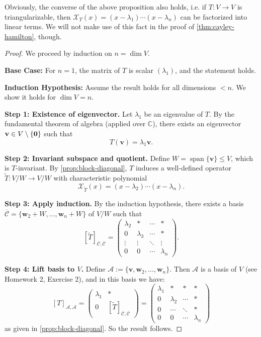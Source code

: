 Obviously, the converse of the above proposition also holds, i.e. if $T:V \to V$ is triangularizable, then $\mathcal{X}_T(x) = (x - \lambda_1) \cdots (x - \lambda_n)$ can be factorized into linear terms. We will not make use of this fact in the proof of \autoref{thm:cayley-hamilton}, though.
\begin{proof}
We proceed by induction on \( n = \dim V \).

\textbf{Base Case:} For \( n = 1 \), the matrix of \( T \) is scalar \( (\lambda_1) \), and the statement holds.

\textbf{Induction Hypothesis:} Assume the result holds for all dimensions \( < n \). We show it holds for \( \dim V = n \).

\textbf{Step 1: Existence of eigenvector.}
Let \( \lambda_1 \) be an eigenvalue of \( T \). By the fundamental theorem of algebra (applied over \( \mathbb{C} \)), there exists an eigenvector \( \mathbf{v} \in V \setminus \{{\bf 0}\} \) such that
\[
T(\mathbf{v}) = \lambda_1 \mathbf{v}.
\]

\textbf{Step 2: Invariant subspace and quotient.}
Define \( W = \operatorname{span}\{\mathbf{v}\} \leq V \), which is \( T \)-invariant. By \autoref{prop:block-diagonal}, \( T \) induces a well-defined operator \( \widetilde{T} : V/W \to V/W \) with characteristic polynomial
\[
\mathcal{X}_{\widetilde{T}}(x) = (x - \lambda_2) \cdots (x - \lambda_n).
\]

\textbf{Step 3: Apply induction.}
By the induction hypothesis, there exists a basis \( \overline{\mathcal{C}} = \{ \mathbf{w}_2 + W, \dots, \mathbf{w}_n + W \} \) of \( V/W \) such that
\[
[\widetilde{T}]_{\overline{\mathcal{C}}, \overline{\mathcal{C}}} =
\begin{pmatrix}
\lambda_2 & * & \cdots & * \\
0 & \lambda_3 & \cdots & * \\
\vdots & \vdots & \ddots & \vdots \\
0 & 0 & \cdots & \lambda_n
\end{pmatrix}.
\]

\textbf{Step 4: Lift basis to \( V \).}
Define \( \mathcal{A} := \{ \mathbf{v}, \mathbf{w}_2, \dots, \mathbf{w}_n \} \). Then \( \mathcal{A} \) is a basis of \( V \) (see Homework 2, Exercise 2), and in this basis we have:
\[
[T]_{\mathcal{A}, \mathcal{A}} =
\begin{pmatrix}
\lambda_1 & * \\
0 & [\widetilde{T}]_{\overline{\mathcal{C}}, \overline{\mathcal{C}}}
\end{pmatrix}
=
\begin{pmatrix}
\lambda_1 & * & * & * \\
0 & \lambda_2 & \cdots & * \\
0 & \cdots & \ddots & * \\
0 & 0 & \cdots & \lambda_n
\end{pmatrix}
\]
as given in \autoref{prop:block-diagonal}. So the result follows.
\end{proof}
